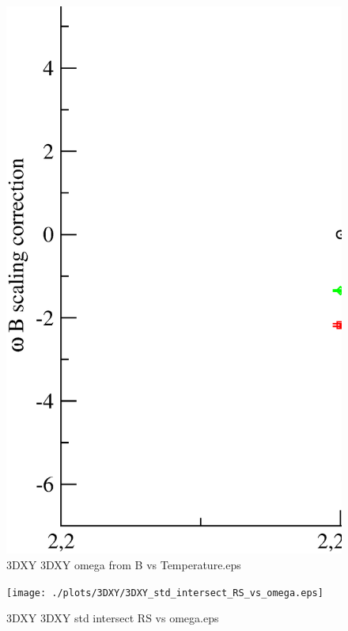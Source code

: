 \begin{figure}[!htpb]
  \centering
  \includegraphics[width=\textwidth]{./plots/3DXY/3DXY_omega_from_B_vs_Temperature.eps}
  \caption{3DXY 3DXY omega from B vs Temperature.eps}
\end{figure}

\begin{figure}[!htpb]
  \centering
  \texttt{[image: ./plots/3DXY/3DXY\_std\_intersect\_RS\_vs\_omega.eps]}
  \caption{3DXY 3DXY std intersect RS vs omega.eps}
\end{figure}

